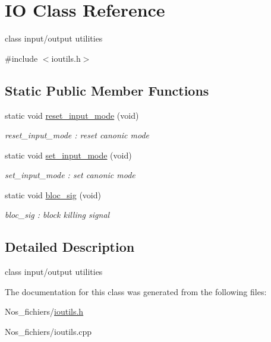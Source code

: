 \hypertarget{class_i_o}{}\section{IO Class Reference}
\label{class_i_o}


class input/output utilities  




{\ttfamily \#include $<$ioutils.\+h$>$}

\subsection*{Static Public Member Functions}
\begin{DoxyCompactItemize}
\item 
\mbox{\label{class_i_o_ab12869aebd0bb5949e49274cf945302b}} 
static void \hyperlink{class_i_o_ab12869aebd0bb5949e49274cf945302b}{reset\+\_\+input\+\_\+mode} (void)
\begin{DoxyCompactList}\small\item\em reset\+\_\+input\+\_\+mode \+: reset canonic mode \end{DoxyCompactList}\item 
\mbox{\label{class_i_o_a858adbf57d51b1e4ddafb2e3da35d6f5}} 
static void \hyperlink{class_i_o_a858adbf57d51b1e4ddafb2e3da35d6f5}{set\+\_\+input\+\_\+mode} (void)
\begin{DoxyCompactList}\small\item\em set\+\_\+input\+\_\+mode \+: set canonic mode \end{DoxyCompactList}\item 
\mbox{\label{class_i_o_a80efa33918c993cec6397000e0e684ae}} 
static void \hyperlink{class_i_o_a80efa33918c993cec6397000e0e684ae}{bloc\+\_\+sig} (void)
\begin{DoxyCompactList}\small\item\em bloc\+\_\+sig \+: block killing signal \end{DoxyCompactList}\end{DoxyCompactItemize}


\subsection{Detailed Description}
class input/output utilities 

The documentation for this class was generated from the following files\+:\begin{DoxyCompactItemize}
\item 
Nos\+\_\+fichiers/\hyperlink{ioutils_8h}{ioutils.\+h}\item 
Nos\+\_\+fichiers/ioutils.\+cpp\end{DoxyCompactItemize}
